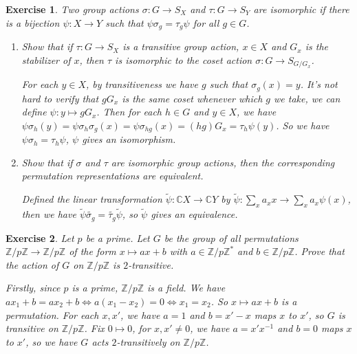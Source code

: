 \documentclass[11pt]{report}
\theoremstyle{mythm}
\let\oldendproof\endproof
\renewenvironment{proof}[1][\proofname]{%
  \oldproof[\normalfont \bfseries #1]%
}{\oldendproof}
\newtheorem{exercise}{Exercise}[chapter]
\renewcommand*{\proofname}{Proof}
\theoremstyle{myans}
\newcommand{\bbZ}{\mathbb Z}
\newcommand{\bbC}{\mathbb C}
\begin{document}
\begin{exercise}
  Two group actions $\sigma\colon G\to S_X$ and $\tau\colon G\to S_Y$ are isomorphic if
  there is a bijection $\psi \colon X \to Y$ such that $\psi \sigma_g =\tau_g\psi$ for all $g\in G$.
  \begin{enumerate}
    \item Show that if $\tau\colon G \to S_X$ is a transitive group action, $x \in X$ and $G_x$ is the
    stabilizer of $x$, then $\tau$ is isomorphic to the coset action $\sigma \colon G \to S_{G / G_x}$.
    \begin{proof}
      For each $y\in X$, by transitiveness we have $g$ such that $\sigma_g(x) = y$. It's not hard to
      verify that $gG_x$ is the same coset whenever which $g$ we take, we can define
      $\psi\colon y\mapsto gG_x$. Then for each $h\in G$ and $y\in X$, we have
      $\psi \sigma_h(y) = \psi \sigma_h \sigma_g(x) = \psi \sigma_{hg}(x) = (hg)G_x
      = \tau_h \psi(y)$. So we have $\psi \sigma_h = \tau_h \psi$, $\psi$ gives an isomorphism.
    \end{proof}
    \item Show that if $\sigma$ and $\tau$ are isomorphic group actions, then the corresponding permutation representations are equivalent.
    \begin{proof}
      Defined the linear transformation $\tilde{\psi}\colon \bbC X \to \bbC Y$ by
      $\tilde{\psi}\colon \sum_x a_x x\to \sum_x a_x \psi(x)$, then we have
      $\tilde{\psi} \widetilde{\sigma_g} = \widetilde{\tau_g} \tilde{\psi}$, so $\tilde \psi$ gives an
      equivalence.
    \end{proof}
  \end{enumerate}
\end{exercise}

\begin{exercise}
  Let $p$ be a prime. Let $G$ be the group of all permutations $\bbZ/p\bbZ\to \bbZ/p\bbZ$ of the form
  $x\mapsto ax+b$ with $a\in \bbZ/p\bbZ^*$ and $b\in \bbZ/p\bbZ$. Prove that the action of $G$ on
  $\bbZ/p\bbZ$ is $2$-transitive.
  \begin{proof}
    Firstly, since $p$ is a prime, $\bbZ/p\bbZ$ is a field. We have $ax_1 + b = ax_2 + b \iff a(x_1-x_2) = 0\iff x_1=x_2$.
    So $x\mapsto ax+b$ is a permutation. For each $x, x'$, we have $a = 1$ and $b = x'-x$ maps $x$ to $x'$,
    so $G$ is transitive on $\bbZ/p\bbZ$. Fix $0\mapsto 0$, for $x,x'\neq 0$, we have $a = x'x^{-1}$ and $b=0$
    maps $x$ to $x'$, so we have $G$ acts $2$-transitively on $\bbZ/p\bbZ$.
  \end{proof}
\end{exercise}
\end{document}
